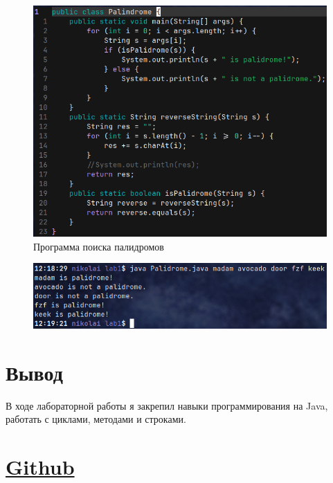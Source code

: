 \documentclass[a4paper, 17pt]{extarticle}
\begin{document}
\begin{figure}[h]
  \centering
  \includegraphics[width=.6\textwidth]{palidrome.png}
  \caption{Программа поиска палидромов}
\end{figure}
\begin{figure}[h]
  \centering
  \includegraphics[width=.6\textwidth]{palidrome_output.png}
  \caption{}
\end{figure}

\pagebreak
\section{Вывод}
В ходе лабораторной работы я закрепил навыки программирования на Java, работать
с циклами, методами и строками.

\section{\href{https://github.com/KLARKOFF/IT-and-Programming-labs}{Github}}
\end{document}
